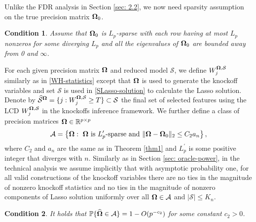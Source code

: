 \documentclass[11pt]{article}
\newtheorem{assumption}{Condition}%
\newcommand{\bX}{\mbox{\bf X}}
\newcommand{\bzero}{\mbox{\bf 0}}
\newcommand{\bSig}{\mbox{\boldmath $\Sigma$}}
\newcommand{\bOmg}{\mbox{\boldmath $\Omega$}}
\newcommand{\wh}{\widehat}
\newcommand{\calA}{{\cal A}}
\newcommand{\sbOmg}{\mbox{\scriptsize\boldmath $\Omega$}}
\begin{document}


Unlike the FDR analysis in Section \ref{sec: 2.2}, we now need sparsity assumption on the true precision matrix $\bOmg_{0}$.

\begin{assumption}\label{cond2}
Assume that $\bOmg_{0}$ is $L_p$-sparse with each row having at most $L_p$ nonzeros for some diverging $L_p$ and all the eigenvalues of $\bOmg_{0}$ are bounded away from 0 and $\infty$.
\end{assumption}

For each given precision matrix $\bOmg$ and reduced model $\mathcal{S}$, we define $W_j^{\sbOmg, \mathcal{S}}$ similarly as in \eqref{WH-statistics} except that $\bOmg$ is used to generate the knockoff variables and set $\mathcal{S}$ is used in \eqref{SLasso-solution} to calculate the Lasso solution. Denote by $\wh{\mathcal{S}}^{\sbOmg} = \{j: W_j^{\sbOmg, \mathcal{S}} \geq T \} \subset \mathcal{S}$ the final set of selected features using the LCD $W_j^{\sbOmg, \mathcal{S}}$ in the knockoffs inference framework. We further define a class of precision matrices $\bOmg \in \mathbb{R}^{p\times p}$
\begin{equation} \label{neweq007}
\calA = \left\{\bOmg: \ \bOmg \text{ is } L_p^{\prime}\text{-sparse and } \|\bOmg - \bOmg_0\|_2 \leq C_2a_n\right\},
\end{equation}
where $C_2$ and $a_n$ are the same as in Theorem \ref{thm1} and $L_p^{\prime}$ is some positive integer that diverges with $n$.  Similarly as in Section \ref{sec: oracle-power}, in the technical analysis we assume implicitly that with asymptotic probability one, for all valid constructions of the knockoff variables there are no ties in the magnitude of nonzero knockoff statistics %
and no ties in the magnitude of nonzero components of Lasso solution uniformly over all $\bOmg \in \calA$ and $|\mathcal{S}|\leq K_n$.

\begin{assumption}\label{cond5}
It holds that $\mathbb{P}\{\wh{\bOmg} \in \calA\} = 1 - O(p^{-c_2})$ for some constant $c_2 > 0$.
\end{assumption}
\end{document}
